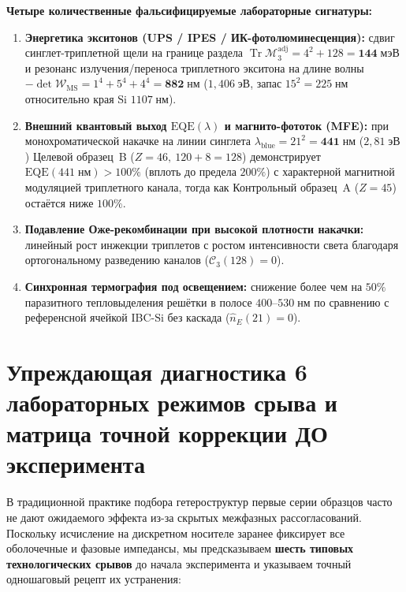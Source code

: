 \documentclass[11pt,a4paper]{article}
\theoremstyle{plain}
\theoremstyle{definition}
\begin{document}
\noindent\textbf{Четыре количественные фальсифицируемые лабораторные сигнатуры:}
\begin{enumerate}[label=\textbf{(M\arabic*)},leftmargin=*,noitemsep]
\item \textbf{Энергетика экситонов (UPS / IPES / ИК-фотолюминесценция):} сдвиг синглет-триплетной щели на границе раздела $\operatorname{Tr}\mathcal{M}_3^{\mathrm{adj}} = 4^2 + 128 = \mathbf{144\;\text{мэВ}}$ и резонанс излучения/переноса триплетного экситона на длине волны $-\det\mathcal{W}_{\mathrm{MS}} = 1^4 + 5^4 + 4^4 = \mathbf{882\;\text{нм}}$ ($1{,}406\;\text{эВ}$, запас $15^2 = 225\;\text{нм}$ относительно края $\mathrm{Si}$ $1107\;\text{нм}$).
\item \textbf{Внешний квантовый выход $\mathrm{EQE}(\lambda)$ и магнито-фототок (MFE):} при монохроматической накачке на линии синглета $\lambda_{\mathrm{blue}} = 21^2 = \mathbf{441\;\text{нм}}$ ($2{,}81\;\text{эВ}$) Целевой образец~B ($Z=46,\ 120+8=128$) демонстрирует $\mathrm{EQE}(441\;\text{нм}) > 100\%$ (вплоть до предела $200\%$) с характерной магнитной модуляцией триплетного канала, тогда как Контрольный образец~A ($Z=45$) остаётся ниже $100\%$.
\item \textbf{Подавление Оже-рекомбинации при высокой плотности накачки:} линейный рост инжекции триплетов с ростом интенсивности света благодаря ортогональному разведению каналов ($\mathcal{C}_3(128) = 0$).
\item \textbf{Синхронная термография под освещением:} снижение более чем на $50\%$ паразитного тепловыделения решётки в полосе $400\text{--}530\;\text{нм}$ по сравнению с референсной ячейкой IBC-$\mathrm{Si}$ без каскада ($\hat{n}_E(21) = 0$).
\end{enumerate}

\section{Упреждающая диагностика 6 лабораторных режимов срыва и матрица точной коррекции ДО эксперимента}
\label{sec:remediation-matrix}

В традиционной практике подбора гетероструктур первые серии образцов часто не дают ожидаемого эффекта из-за скрытых межфазных рассогласований. Поскольку исчисление на дискретном носителе заранее фиксирует все оболочечные и фазовые импедансы, мы предсказываем \textbf{шесть типовых технологических срывов} до начала эксперимента и указываем точный одношаговый рецепт их устранения:
\end{document}
